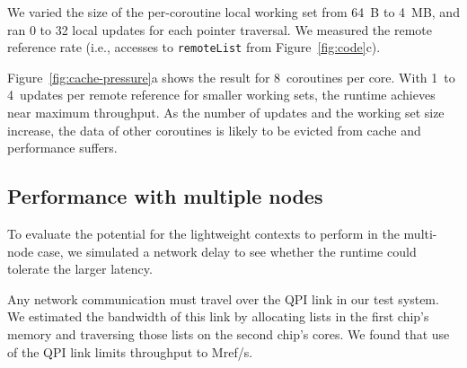 \documentclass[10pt,nocopyrightspace]{sigplanconf}
\newcommand{\mrps}[1]{\unit[#1]{Mref/s}}
\begin{document}
We varied the size of the per-coroutine local working set from 64~B
to 4~MB, and ran 0 to 32 local updates for each pointer
traversal. We measured the remote reference rate (i.e., accesses to \texttt{remoteList} from Figure~\ref{fig:code}c).

Figure~\ref{fig:cache-pressure}a shows the result for 8~coroutines per
core.  With 1~to 4~updates per remote reference for smaller working
sets, the runtime achieves near maximum throughput. 
As the number of updates and the working set size increase, the data
of other coroutines is likely to be evicted from cache and performance
suffers.


\subsection{Performance with multiple nodes}

To evaluate the potential for the lightweight contexts to perform in
the multi-node case, we simulated a network delay to see whether the
runtime could tolerate the larger latency.

Any network communication must travel over the QPI link in our test
system. We estimated the bandwidth of this link by allocating lists in
the first chip's memory and traversing those lists on the second
chip's cores. We found that use of the QPI link limits throughput to
\mrps{175}.

\end{document}
